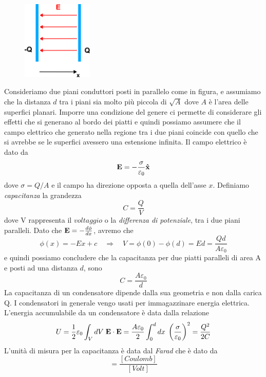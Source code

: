 \begin{figure} %
    \centering
    \includegraphics[width=0.3\textwidth]{images/parallelcapac} %
\end{figure}
Consideriamo due piani conduttori posti in parallelo come in figura, e assumiamo che la distanza $d$ tra i piani sia molto pi\`u piccola di $\sqrt{A}$ dove $A$ \`e l'area delle superfici planari. Imporre una condizione del genere ci permette di considerare gli effetti che si generano al bordo dei piatti e quindi possiamo assumere che il campo elettrico che generato nella regione tra i due piani coincide con quello che si avrebbe se le superfici avessero una estensione infinita. Il campo elettrico \`e dato da 
\begin{equation*}
	\bold{E} = -\frac{\sigma}{\varepsilon_0} \bold{\hat{x}}
\end{equation*}
dove $\sigma = Q/A$ e il campo ha direzione opposta a quella dell'asse $x$. Definiamo \textit{capacitanza} la grandezza 
\begin{equation}
	C = \frac{Q}{V}
\end{equation}
dove V rappresenta il $voltaggio$ o la \textit{differenza di potenziale}, tra i due piani paralleli. Dato che $\bold{E} = -\frac{d\phi}{dx}$, avremo che 
\begin{equation*}
	\phi(x) =-Ex+c \quad \Rightarrow \quad V = \phi(0) - \phi(d) = Ed = \frac{Qd}{A \varepsilon_0}
\end{equation*} 
e  quindi possiamo concludere che la capacitanza per due piatti paralleli di area A e posti ad una distanza $d$, sono
\begin{equation*}
	C = \frac{A \varepsilon_0}{d}
\end{equation*}
La capacitanza di un condensatore dipende dalla sua geometria e non dalla carica Q. I condensatori in generale vengo usati per immagazzinare energia elettrica. L'energia accumulabile da un condensatore \`e data dalla relazione 
\begin{equation*}
	U = \frac{1}{2} \varepsilon_0 \int_V dV \; \bold{E} \cdot \bold{E} = \frac{A \varepsilon_0}{2} \int_{0}^{d} dx \; \left ( \frac{\sigma}{\varepsilon_0}\right)^2 = \frac{Q^2}{2C}
\end{equation*}
L'unit\`a di misura per la capacitanza \`e data dal \textit{Farad} che \`e dato da 
\begin{equation*}
	[F] = \frac{[Coulomb]}{[Volt]}
\end{equation*}

